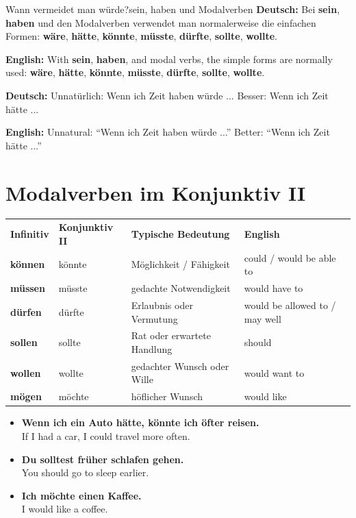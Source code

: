 \documentclass[a4paper,11pt]{article}
\newcommand{\GermanText}[1]{\textbf{Deutsch: }#1\par}
\newcommand{\EnglishText}[1]{{\small\color{SoftGray}\textbf{English: }#1\par}}
\newcommand{\ExampleItem}[2]{\item \textbf{#1}\\{\small\color{SoftGray}#2}}
\begin{document}
        \begin{grammarentry}{Wann vermeidet man würde?}{sein, haben und Modalverben}
            \GermanText{Bei \textbf{sein}, \textbf{haben} und den Modalverben verwendet man normalerweise die einfachen Formen: \textbf{wäre}, \textbf{hätte}, \textbf{könnte}, \textbf{müsste}, \textbf{dürfte}, \textbf{sollte}, \textbf{wollte}.}
            \EnglishText{With \textbf{sein}, \textbf{haben}, and modal verbs, the simple forms are normally used: \textbf{wäre}, \textbf{hätte}, \textbf{könnte}, \textbf{müsste}, \textbf{dürfte}, \textbf{sollte}, \textbf{wollte}.}

            \GermanText{Unnatürlich: \glqq Wenn ich Zeit haben würde ...\grqq{} Besser: \glqq Wenn ich Zeit hätte ...\grqq}
            \EnglishText{Unnatural: ``Wenn ich Zeit haben würde ...'' Better: ``Wenn ich Zeit hätte ...''}
        \end{grammarentry}

    \section{Modalverben im Konjunktiv II}

        \begin{longtable}{>{\bfseries}p{2.7cm}|p{3cm}|p{3.4cm}|p{4cm}}
            \rowcolor{HeaderBlueDark}
            \color{white}\textbf{Infinitiv} &
            \color{white}\textbf{Konjunktiv II} &
            \color{white}\textbf{Typische Bedeutung} &
            \color{white}\textbf{English} \\
            können & könnte & Möglichkeit / Fähigkeit & could / would be able to \\
            müssen & müsste & gedachte Notwendigkeit & would have to \\
            dürfen & dürfte & Erlaubnis oder Vermutung & would be allowed to / may well \\
            sollen & sollte & Rat oder erwartete Handlung & should \\
            wollen & wollte & gedachter Wunsch oder Wille & would want to \\
            mögen & möchte & höflicher Wunsch & would like \\
        \end{longtable}

        \begin{exbox}
            \begin{itemize}
                \ExampleItem{Wenn ich ein Auto hätte, könnte ich öfter reisen.}{If I had a car, I could travel more often.}
                \ExampleItem{Du solltest früher schlafen gehen.}{You should go to sleep earlier.}
                \ExampleItem{Ich möchte einen Kaffee.}{I would like a coffee.}
            \end{itemize}
        \end{exbox}
\end{document}
